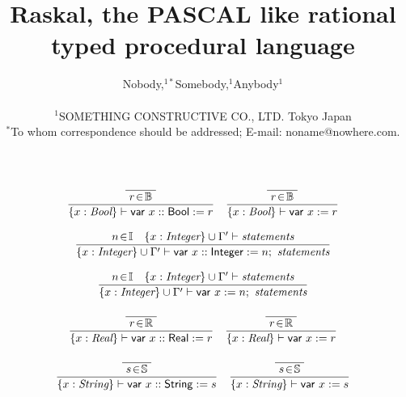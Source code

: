 \documentclass[12pt]{article}
\title{Raskal, the PASCAL like rational typed procedural language}
\author
{Nobody,$^{1\ast}$Somebody,$^{1}$Anybody$^{1}$\\
\\
\normalsize{$^{1}$SOMETHING CONSTRUCTIVE  CO., LTD. Tokyo Japan}\\
\normalsize{$^\ast$To whom correspondence should be addressed;
  E-mail: noname@nowhere.com.}
}
\date{}
\begin{document}
\maketitle

\begin{displaymath}
  \begin{array}{c}
    \begin{array}{rl}
      \dfrac{
        \dfrac{}{
          \raisebox{0.6ex}[2.3ex][0ex]{
            $r \!\in\! \mathbb{B}$
          }
        }
      }{
        \{x : \text{\it Bool} \} \vdash \mathsf{var}\ x :: \mathsf{Bool} := r
      }
      & \dfrac{
          \dfrac{}{
            \raisebox{0.6ex}[2.3ex][0ex]{
              $r \!\in\! \mathbb{B}$
            }
          }
        }{
          \{x : \text{\it Bool} \} \vdash \mathsf{var}\ x := r
        }
    \end{array}  \\
    \\
    
    \dfrac{
      n \!\in\! \mathbb{I} \quad
      \{x : \text{\it Integer} \} \cup \Gamma' \vdash \text{\it statements}
    }{
      \{x : \text{\it Integer} \} \cup \Gamma' \vdash \mathsf{var}\ x ::
       \mathsf{Integer} := n ;\ \text{\it statements}
    }  \\
    \\
    
    \dfrac{
      n \!\in\! \mathbb{I} \quad
      \{x : \text{\it Integer} \} \cup \Gamma' \vdash \text{\it statements}
    }{
      \{x : \text{\it Integer} \} \cup \Gamma' \vdash \mathsf{var}\ x :=
       n;\ \text{\it statements}
    }  \\
    \\
    
    \begin{array}{rl}
      \dfrac{
        \dfrac{}{
          \raisebox{0.6ex}[2.3ex][0ex]{
            $r \!\in\! \mathbb{R}$
          }
        }
      }{
        \{x : \text{\it Real} \} \vdash \mathsf{var}\ x :: \mathsf{Real} := r
      }
      & \dfrac{
          \dfrac{}{
            \raisebox{0.6ex}[2.3ex][0ex]{
              $r \!\in\! \mathbb{R}$
            }
          }
        }{
          \{x : \text{\it Real} \} \vdash \mathsf{var}\ x := r
        }
    \end{array}  \\
    \\
    
    \begin{array}{rl}
      \dfrac{
        \dfrac{}{
          \raisebox{0.6ex}[2.3ex][0ex]{
            $s \!\in\! \mathbb{S}$
          }
        }
      }{
        \{x : \text{\it String} \} \vdash \mathsf{var}\ x :: \mathsf{String} := s
      }
      & \dfrac{
          \dfrac{}{
            \raisebox{0.6ex}[2.3ex][0ex]{
              $s \!\in\! \mathbb{S}$
            }
          }
        }{
          \{x : \text{\it String} \} \vdash \mathsf{var}\ x := s
        }
    \end{array}  \\
    \\
    

\end{array}
\end{displaymath}
\end{document}
